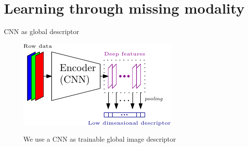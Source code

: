 \section{Learning through missing modality}

\label{sec:method}
\begin{frame}{CNN as global descriptor}
	\begin{figure}
		
		\includegraphics[width=0.5\linewidth]{vect/intro/Desc}
		
		We use a CNN as trainable global image descriptor
	\end{figure}
	\vfill	
\end{frame}



